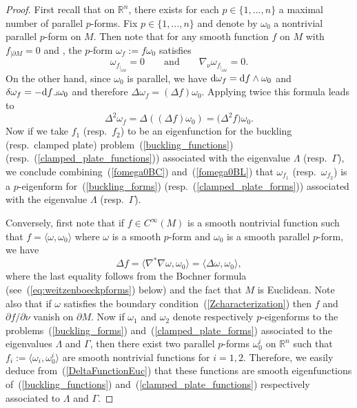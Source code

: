 \documentclass[pdftex]{sigma}
\let\<\langle
\let\>\rangle
\numberwithin{equation}{section}
\theoremstyle{definition}
\begin{document}
\begin{proof} First recall that on $\mathbb{R}^n$, there exists for each $p\in\{1,\dots,n\}$ a maximal number of parallel $p$-forms.
Fix $p\in\{1,\dots,n\}$ and denote by $\omega_0$ a nontrivial parallel $p$-form on $M$.
Then note that for any smooth function $f$ on $M$ with $f_{|\partial M}=0$ and , the $p$-form $\omega_f:=f \omega_0$ satisfies
\begin{equation}\label{fomega0BC}
\omega_{f_{|_{\partial M}}}=0\qquad\text{and}\qquad \nabla_\nu\omega_{f_{|_{\partial M}}}=0.
\end{equation}
On the other hand, since $\omega_0$ is parallel, we have ${\rm d}\omega_f={\rm d}f\wedge\omega_0$ and $\delta\omega_f=-{\rm d}f\lrcorner\omega_0$ and therefore $\Delta\omega_f=(\Delta f)\omega_0$. Applying twice this formula leads to
\begin{equation}\label{fomega0BL}
\Delta^2\omega_f=\Delta ((\Delta f)\omega_0 )=\bigl(\Delta^2 f\bigr)\omega_0.
\end{equation}
Now if we take $f_1$ (resp.\ $f_2$) to be an eigenfunction for the buckling (resp.\ clamped plate) problem~(\ref{buckling_functions}) (resp.\ (\ref{clamped_plate_functions})) associated with the eigenvalue $\Lambda$ (resp.\ $\Gamma$), we conclude combining~(\ref{fomega0BC}) and~(\ref{fomega0BL}) that $\omega_{f_1}$ (resp.\ $\omega_{f_2}$) is a $p$-eigenform for~(\ref{buckling_forms}) (resp.\ (\ref{clamped_plate_forms})) associated with the eigenvalue $\Lambda$ (resp.\ $\Gamma$).

Conversely, first note that if $f\in C^\infty(M)$ is a smooth nontrivial function such that $f=\<\omega,\omega_0\>$ where $\omega$ is a smooth $p$-form and $\omega_0$ is a smooth parallel $p$-form, we have
\begin{equation}\label{DeltaFunctionEuc}
\Delta f=\<\nabla^\ast\nabla\omega,\omega_0\>=\<\Delta\omega,\omega_0\>,
\end{equation}
where the last equality follows from the Bochner formula (see~(\ref{eq:weitzenboeckpforms}) below) and the fact that $M$ is Euclidean.
Note also that if $\omega$ satisfies the boundary condition~(\ref{Zcharacterization}) then $f$ and $\partial f/\partial\nu$ vanish on $\partial M$.
Now if $\omega_1$ and $\omega_2$ denote respectively $p$-eigenforms to the problems~(\ref{buckling_forms}) and~(\ref{clamped_plate_forms}) associated to the eigenvalues $\Lambda$ and $\Gamma$, then there exist two parallel $p$-forms $\omega^i_0$ on $\mathbb{R}^n$ such that $f_i:=\bigl\langle\omega_i,\omega^i_0\big\rangle$ are smooth nontrivial functions for $i=1,2$. Therefore, we easily deduce from~(\ref{DeltaFunctionEuc}) that these functions are smooth eigenfunctions of~(\ref{buckling_functions}) and~(\ref{clamped_plate_functions}) respectively associated to $\Lambda$ and $\Gamma$.
\end{proof}
\end{document}
